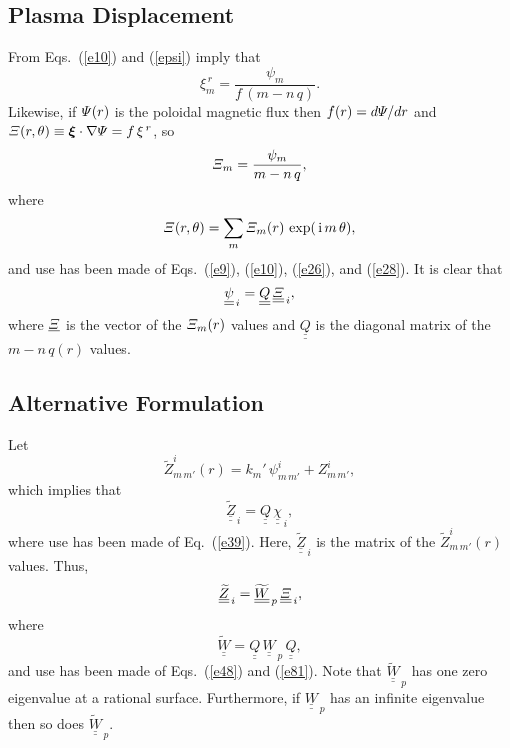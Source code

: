 \documentclass[12pt,prb,aps,notitlepage]{revtex4-1}
\newcommand{\bxi}{\mbox{\boldmath$\xi$}}
\begin{document}
\subsection{Plasma Displacement}
From Eqs.~(\ref{e10}) and (\ref{epsi}) imply that
\begin{equation}
\xi^{\,r}_m = \frac{\psi_m}{f\,(m-n\,q)}.
\end{equation}
Likewise, if ${\mit\Psi}(r)$ is the poloidal magnetic flux then $f(r)=d{\mit\Psi}/dr$ and ${\mit\Xi}(r,\theta)\equiv \bxi\cdot\nabla{\mit\Psi}= f\,\xi^{\,r}$, so
\begin{equation}
{\mit\Xi}_m = \frac{\psi_m}{m-n\,q},
\end{equation}
where
\begin{equation}
{\mit\Xi}(r,\theta)= \sum_m {\mit\Xi}_m(r)\,\exp(\,{\rm i}\,m\,\theta),
\end{equation}
and use has been made of Eqs.~(\ref{e9}), (\ref{e10}), (\ref{e26}), and (\ref{e28}). 
It is clear that
\begin{equation}\label{e81}
\underline{\underline{\psi}}_{\,i} = \underline{\underline{Q}}\,\underline{\underline{\mit\Xi}}_{\,i},
\end{equation}
where $\underline{\mit\Xi}$ is the vector of the ${\mit\Xi}_m(r)$ values and $\underline{\underline{Q}}$ is the diagonal matrix of the $m-n\,q(r)$ values. 

\subsection{Alternative Formulation}
Let
\begin{equation}
\widetilde{Z}^i_{m\,m'}(r) = k_{m}'\,\psi^i_{m\,m'}+Z_{m\,m'}^i,
\end{equation}
which implies that
\begin{equation}
\underline{\underline{\widetilde{Z}}}_{\,i} = \underline{\underline{Q}}\,\underline{\underline{\chi}}_{\,i},
\end{equation}
where use has been made of Eq.~(\ref{e39}). Here, $\underline{\underline{\widetilde{Z}}}_{\,i} $ is the matrix of the $\widetilde{Z}^i_{m\,m'}(r)$
values. 
Thus,
\begin{equation}
\underline{\underline{\widetilde{Z}}}_{\,i}= \underline{\underline{\widetilde{W}}}_{\,p}\,\underline{\underline{\mit\Xi}}_{\,i},
\end{equation}
where
\begin{equation}
\underline{\underline{\widetilde{W}}}= \underline{\underline{Q}}\,\underline{\underline{W}}_{\,p}\,\underline{\underline{Q}},
\end{equation}
and use has been made of Eqs.~(\ref{e48}) and (\ref{e81}). 
Note that $\underline{\underline{\widetilde{W}}}_{\,p}$ has one zero eigenvalue at a rational surface. Furthermore, if
$\underline{\underline{W}}_{\,p}$ has an infinite eigenvalue then so does $\underline{\underline{\widetilde{W}}}_{\,p}$.
\end{document}
